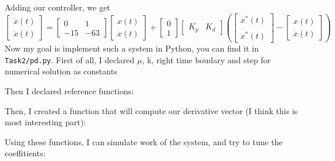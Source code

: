 \documentclass[a4paper,12pt]{article}
\begin{document}
        Adding our controller, we get 
        \begin{equation*}
            \begin{bmatrix}
                \dot{x}(t)\\
                \ddot{x}(t)
            \end{bmatrix}
            = 
            \begin{bmatrix}
                0 & 1 \\
                -15 & -63
            \end{bmatrix}
            \begin{bmatrix}
                x(t)\\
                \dot{x}(t)
            \end{bmatrix}
            +
            \begin{bmatrix}
                0 \\
                1
            \end{bmatrix}
            \begin{bmatrix}
                K_p & K_d
            \end{bmatrix}
            \left(
            \begin{bmatrix}
                x^*(t)\\
                \dot{x^*}(t)
            \end{bmatrix}
            -
            \begin{bmatrix}
                x(t)\\
                \dot{x}(t)
            \end{bmatrix}
            \right)
        \end{equation*}
        Now my goal is implement such a system in Python, you can find it in 
        \texttt{Task2/pd.py}. First of all, I declared $\mu$, k, right time 
        boudary and step for numerical solution as constants
        
        Then I declared reference functions:
        
        Then, I created a function that will compute our derivative vector (I think 
        this is most interesting part):
        
        Using these functions, I can simulate work of the system, and try to tune the 
        coeffitients:
        
\end{document}
